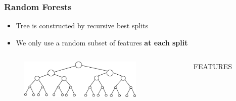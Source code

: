 \documentclass[xcolor={dvipsnames}]{beamer}
\def\die#1{{\domino#1}}
\begin{document}
\frame
{
\frametitle{Random Forests}


\begin{itemize}
\item<1-> Tree is constructed by recursive best splits
\item<3-> We only use a random subset of features \textbf{at each split}
\end{itemize}


\begin{columns}
\begin{column}{.5\textwidth}

\vspace{-.3in}

\begin{figure}
\centering

\includegraphics[width=2.3in]{stuffs/9XeYs.png}



\only<3>{${}$\\$\quad \txt{\die2 \die6}$\\${}$\\$\quad \;\spadesuit \; \square  \oslash  \oplus$
\vspace{.32in}
} 
\only<4->{${}$\\$\quad \txt{\die3 \die2}$\\${}$\\$\quad\clubsuit \; \blacksquare \otimes \odot$
\vspace{.32in}
}



\end{figure}

\end{column}
\begin{column}{.5\textwidth}

\begin{figure}
\centering
FEATURES


\end{figure}
\end{column}
\end{columns}}
\end{document}
